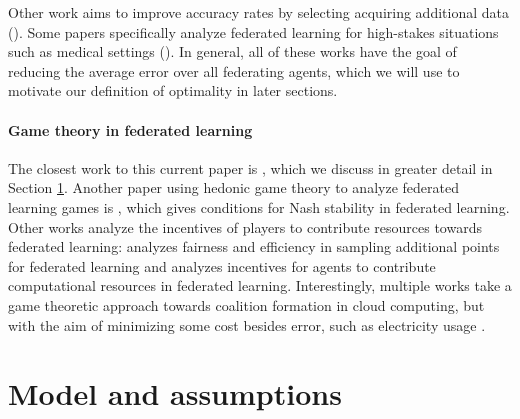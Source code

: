 \documentclass{article}
\begin{document}
Other work aims to improve accuracy rates by selecting acquiring additional data (\cite{collabPAC, Duan_selfbalance}). Some papers specifically analyze federated learning for high-stakes situations such as medical settings (\cite{xia2021auto, guo2021multi, vaid2021federated, kumar2021blockchain, zhang2021dynamic}). In general, all of these works have the goal of reducing the average error over all federating agents, which we will use to motivate our definition of optimality in later sections. 

\paragraph{\bf Game theory in federated learning}

The closest work to this current paper is \citet{donahue2020model}, which we discuss in greater detail in Section \ref{sec:model}. Another paper using hedonic game theory to analyze federated learning games is \citet{hasan2021incentive},  which gives conditions for Nash stability in federated learning. Other works analyze the incentives of players to contribute resources towards federated learning: \citet{blum2021one} analyzes fairness and efficiency in sampling additional points for federated learning and \citet{incentivemech} analyzes incentives for agents to contribute computational resources in federated learning. Interestingly, multiple works take a game theoretic approach towards coalition formation in cloud computing, but with the aim of minimizing some cost besides error, such as electricity usage \cite{Guazzone_2014, Anglano2018AGA}. 

\section{Model and assumptions}\label{sec:model}
\end{document}
